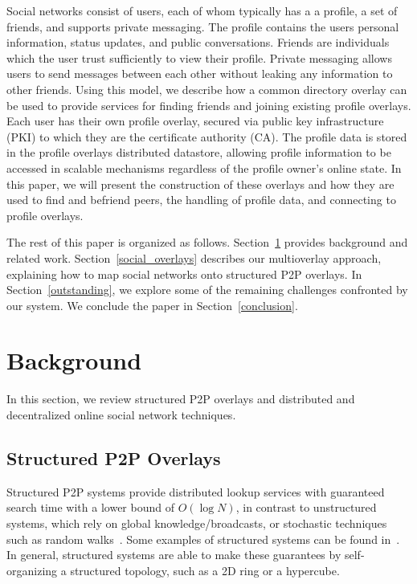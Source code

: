 \documentclass[letterpaper,twocolumn,10pt]{article}
\begin{document}
Social networks consist of users, each of whom typically has a a profile, a set
of friends, and supports private messaging.  The profile contains the users
personal information, status updates, and public conversations.  Friends are
individuals which the user trust sufficiently to view their profile.  Private
messaging allows users to send messages between each other without leaking any
information to other friends.  Using this model, we describe how a common
directory overlay can be used to provide services for finding friends and
joining existing profile overlays.  Each user has their own profile overlay,
secured via public key infrastructure (PKI) to which they are the certificate
authority (CA).  The profile data is stored in the profile overlays distributed
datastore, allowing profile information to be accessed in scalable mechanisms
regardless of the profile owner's online state.  In this paper, we will present
the construction of these overlays and how they are used to find and befriend
peers, the handling of profile data, and connecting to profile overlays.

The rest of this paper is organized as follows.  Section~\ref{background}
provides background and related work.  Section~\ref{social_overlays} describes
our multioverlay approach, explaining how to map social networks onto structured
P2P overlays.  In Section~\ref{outstanding}, we explore some of the remaining
challenges confronted by our system.  We conclude the paper in
Section~\ref{conclusion}.

\section{Background}
\label{background}
In this section, we review structured P2P overlays and distributed and
decentralized online social network techniques.
\subsection{Structured P2P Overlays}
Structured P2P systems provide distributed lookup services with guaranteed
search time with a lower bound of $O(\log N)$, in contrast to unstructured
systems, which rely on global knowledge/broadcasts, or stochastic techniques
such as random walks~\cite{unstructured_v_structured}.  Some examples of
structured systems can be found in~\cite{pastry, chord, symphony, kademlia,
can}.  In general, structured systems are able to make these guarantees by
self-organizing a structured topology, such as a 2D ring or a hypercube.
\end{document}
